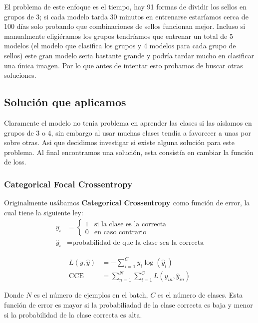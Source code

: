 \documentclass[12pt, titlepage, a4paper]{article}
\begin{document}
El problema de este enfoque es el tiempo, hay 91 formas de dividir los sellos en grupos de 3; si cada modelo tarda 30 minutos en entrenarse estaríamos cerca de 100 días solo probando que combinaciones de sellos funcionan mejor. Incluso si manualmente eligiéramos los grupos tendríamos que entrenar un total de 5 modelos (el modelo que clasifica los grupos y 4 modelos para cada grupo de sellos) este gran modelo seria bastante grande y podría tardar mucho en clasificar una única imagen. Por lo que antes de intentar esto probamos de buscar otras soluciones.\\

\subsection{Solución que aplicamos}
Claramente el modelo no tenia problema en aprender las clases si las aislamos en grupos de 3 o 4, sin embargo al usar muchas clases tendía a favorecer a unas por sobre otras. Asi que decidimos investigar si existe alguna solución para este problema. Al final encontramos una solución, esta consistía en cambiar la función de loss.

\subsubsection{Categorical Focal Crossentropy}
Originalmente usábamos \textbf{Categorical Crossentropy \cite{CategoricalCrossentropy}} como función de error, la cual tiene la siguiente ley:
\[
\begin{aligned}
    y_i &= 
    \begin{cases}
        1 & \text{si la clase es la correcta} \\
        0 & \text{en caso contrario}
    \end{cases} \\[2ex]
    \hat{y}_i &= \text{probabilidad de que la clase sea la correcta}
\end{aligned}
\]

\[
\begin{aligned}
    L(y, \hat{y}) &= -\sum_{i=1}^{C} y_i \log(\hat{y}_i) \\[2ex]
    \mathrm{CCE} &= \sum_{n=1}^{N} \sum_{i=1}^{C} L(y_{in}, \hat{y}_{in})
\end{aligned}
\]

Donde $N$ es el número de ejemplos en el batch, $C$ es el número de clases. Esta función de error es mayor si la probabiliadad de la clase correcta es baja y menor si la probabilidad de la clase correcta es alta.\\
\end{document}
